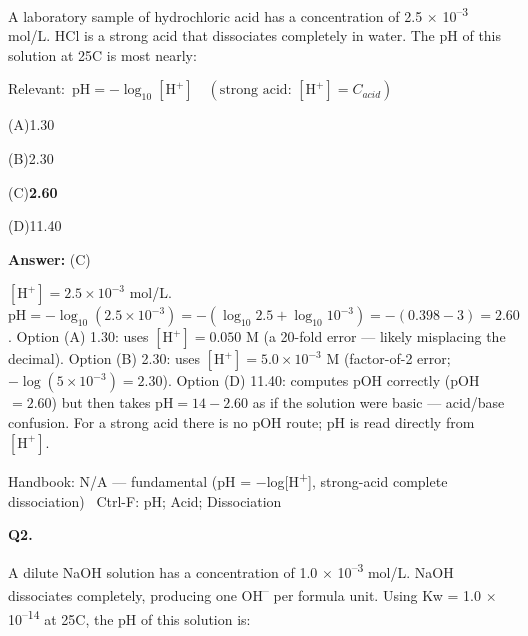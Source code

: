 \documentclass[11pt]{article}
\newcommand{\correct}[1]{\textbf{#1}\;{\color{accent}$\checkmark$}}
\newcommand{\optline}[2]{\par\noindent\hspace{1.2em}(#1)\hspace{0.6em}#2}
\begin{document}
A laboratory sample of hydrochloric acid has a concentration of 2.5 $\times$ 10\textsuperscript{--}\textsuperscript{3} mol/L. HCl is a strong acid that dissociates completely in water. The pH of this solution at 25\textdegree{}C is most nearly:\par\vspace{3pt}
{\small\color{soft}Relevant:}\ $\mathrm{pH} = -\log_{10}[\mathrm{H}^+]\quad (\text{strong acid: } [\mathrm{H}^+] = C_{acid})$\par\vspace{3pt}
\optline{A}{1.30}
\optline{B}{2.30}
\optline{C}{\correct{2.60}}
\optline{D}{11.40}
\par\vspace{3pt}
\vspace{2pt}\par\noindent\colorbox{boxbg}{\parbox{\dimexpr\linewidth-2\fboxsep\relax}{%
\vspace{2pt}\textbf{Answer:} (C)\par\vspace{2pt}
{\small $[\mathrm{H}^+] = 2.5\times10^{-3}$ mol/L.  $\mathrm{pH} = -\log_{10}(2.5\times10^{-3}) = -(\log_{10}2.5 + \log_{10}10^{-3}) = -(0.398 - 3) = 2.60$. Option (A) 1.30: uses $[\mathrm{H}^+] = 0.050$ M (a 20-fold error --- likely misplacing the decimal). Option (B) 2.30: uses $[\mathrm{H}^+] = 5.0\times10^{-3}$ M (factor-of-2 error; $-\log(5\times10^{-3}) = 2.30$). Option (D) 11.40: computes pOH correctly (pOH $= 2.60$) but then takes $\mathrm{pH} = 14-2.60$ as if the solution were basic --- acid/base confusion. For a strong acid there is no pOH route; $\mathrm{pH}$ is read directly from $[\mathrm{H}^+]$.}\par\vspace{2pt}
{\footnotesize\color{soft}Handbook: N/A --- fundamental (pH = $-$log[H\textsuperscript{+}], strong-acid complete dissociation) \textbullet\ Ctrl-F: pH; Acid; Dissociation}\vspace{2pt}
}}
\vspace{9pt}
\filbreak
\textbf{\color{accent}Q2.}\par\vspace{2pt}
A dilute NaOH solution has a concentration of 1.0 $\times$ 10\textsuperscript{--}\textsuperscript{3} mol/L. NaOH dissociates completely, producing one OH\textsuperscript{--} per formula unit. Using Kw = 1.0 $\times$ 10\textsuperscript{--}\textsuperscript{1}\textsuperscript{4} at 25\textdegree{}C, the pH of this solution is:\par\vspace{3pt}
\end{document}
